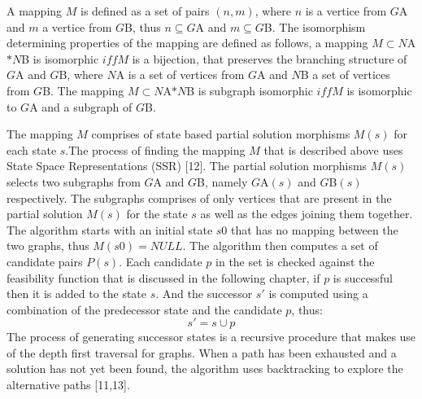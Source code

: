 A mapping $M$ is defined as a set of pairs $(n,m)$, where $n$ is a vertice from $G${\tiny A} and $m$ a vertice from $G${\tiny B}, thus $n \subseteq G${\tiny A} and $m \subseteq G${\tiny B}.\newline\newline
The isomorphism determining properties of the mapping are defined as follows, a mapping $M \subset N${\tiny A} $ * N${\tiny B} is isomorphic $iff M$ is a bijection, that preserves the branching structure of $G${\tiny A} and $G${\tiny B}, where $N${\tiny A} is a set of vertices from $G${\tiny A} and $N${\tiny B} a set of vertices from $G${\tiny B}.\newline\newline
The mapping $M \subset N${\tiny A}$ * N${\tiny B} is subgraph isomorphic $iff M$ is isomorphic to $G${\tiny A} and a subgraph of $G${\tiny B}.

The mapping $M$ comprises of state based partial solution morphisms $M(s)$ for each state $s$.The process of finding the mapping $M$ that is described above uses State Space Representations (SSR) [12].
The partial solution morphisms $M(s)$ selects two subgraphs from $G${\tiny A} and $G${\tiny B}, namely $G${\tiny A}$(s)$ and $G${\tiny B}$(s)$ respectively. The subgraphs comprises of only vertices that are present in the partial solution $M(s)$ for the state $s$ as well as the edges joining them together.\newline\newline
The algorithm starts with an initial state $s0$ that has no mapping between the two graphs, thus $M(s0)= NULL$. The algorithm then computes a set of candidate pairs $P(s)$. Each candidate $p$ in the set is checked against the feasibility function that is discussed in the following chapter, if $p$ is successful then it is added to the state $s$. And the successor $s'$ is computed using a combination of the predecessor state and the candidate $p$, thus:
	\begin{equation}
		s' = s \cup p
	\end{equation}
The process of generating successor states is a recursive procedure that makes use of the depth first traversal for graphs. When a path has been 
exhausted and a solution has not yet been found, the algorithm uses backtracking to explore the alternative paths [11,13]. \newpage

